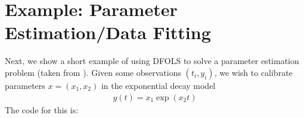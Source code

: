 \documentclass[letterpaper,10pt,english]{sphinxmanual}
\begin{document}
\section{Example: Parameter Estimation/Data Fitting}
\label{\detokenize{userguide:example-parameter-estimation-data-fitting}}
Next, we show a short example of using DFO\sphinxhyphen{}LS to solve a parameter estimation problem (taken from ). Given some observations \((t_i,y_i)\), we wish to calibrate parameters \(x=(x_1,x_2)\) in the exponential decay model
\begin{equation*}
\begin{split}y(t) = x_1 \exp(x_2 t)\end{split}
\end{equation*}
The code for this is:
\end{document}
